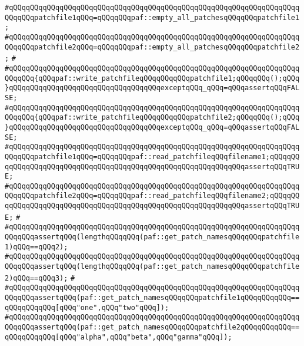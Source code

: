 \newline
\verb|#qQQqqQQqqQQqqQQqqQQqqQQqqQQqqQQqqQQqqQQqqQQqqQQqqQQqqQQqqQQqqQQqqQQqqQQqqQQqpatchfile1qQQq=qQQqqQQqpaf::empty_all_patchesqQQqqQQqpatchfile1;|\newline
\verb|#qQQqqQQqqQQqqQQqqQQqqQQqqQQqqQQqqQQqqQQqqQQqqQQqqQQqqQQqqQQqqQQqqQQqqQQqqQQqpatchfile2qQQq=qQQqqQQqpaf::empty_all_patchesqQQqqQQqpatchfile2;|\newline
\verb|#|\newline
\verb|#qQQqqQQqqQQqqQQqqQQqqQQqqQQqqQQqqQQqqQQqqQQqqQQqqQQqqQQqqQQqqQQqqQQqqQQqqQQq{qQQqpaf::write_patchfileqQQqqQQqqQQqpatchfile1;qQQqqQQq();qQQq}qQQqqQQqqQQqqQQqqQQqqQQqqQQqqQQqqQQqexceptqQQq_qQQq=qQQqassertqQQqFALSE;|\newline
\verb|#qQQqqQQqqQQqqQQqqQQqqQQqqQQqqQQqqQQqqQQqqQQqqQQqqQQqqQQqqQQqqQQqqQQqqQQqqQQq{qQQqpaf::write_patchfileqQQqqQQqqQQqpatchfile2;qQQqqQQq();qQQq}qQQqqQQqqQQqqQQqqQQqqQQqqQQqqQQqqQQqexceptqQQq_qQQq=qQQqassertqQQqFALSE;|\newline
\newline
\newline
\newline
\verb|#qQQqqQQqqQQqqQQqqQQqqQQqqQQqqQQqqQQqqQQqqQQqqQQqqQQqqQQqqQQqqQQqqQQqqQQqqQQqpatchfile1qQQq=qQQqqQQqpaf::read_patchfileqQQqfilename1;qQQqqQQqqQQqqQQqqQQqqQQqqQQqqQQqqQQqqQQqqQQqqQQqqQQqqQQqqQQqqQQqassertqQQqTRUE;|\newline
\verb|#qQQqqQQqqQQqqQQqqQQqqQQqqQQqqQQqqQQqqQQqqQQqqQQqqQQqqQQqqQQqqQQqqQQqqQQqqQQqpatchfile2qQQq=qQQqqQQqpaf::read_patchfileqQQqfilename2;qQQqqQQqqQQqqQQqqQQqqQQqqQQqqQQqqQQqqQQqqQQqqQQqqQQqqQQqqQQqqQQqassertqQQqTRUE;|\newline
\verb|#|\newline
\verb|#qQQqqQQqqQQqqQQqqQQqqQQqqQQqqQQqqQQqqQQqqQQqqQQqqQQqqQQqqQQqqQQqqQQqqQQqqQQqassertqQQq(lengthqQQqqQQq(paf::get_patch_namesqQQqqQQqpatchfile1)qQQq==qQQq2);|\newline
\verb|#qQQqqQQqqQQqqQQqqQQqqQQqqQQqqQQqqQQqqQQqqQQqqQQqqQQqqQQqqQQqqQQqqQQqqQQqqQQqassertqQQq(lengthqQQqqQQq(paf::get_patch_namesqQQqqQQqpatchfile2)qQQq==qQQq3);|\newline
\verb|#|\newline
\verb|#qQQqqQQqqQQqqQQqqQQqqQQqqQQqqQQqqQQqqQQqqQQqqQQqqQQqqQQqqQQqqQQqqQQqqQQqqQQqassertqQQq(paf::get_patch_namesqQQqqQQqpatchfile1qQQqqQQqqQQq==qQQqqQQqqQQq[qQQq"one",qQQq"two"qQQq]);|\newline
\verb|#qQQqqQQqqQQqqQQqqQQqqQQqqQQqqQQqqQQqqQQqqQQqqQQqqQQqqQQqqQQqqQQqqQQqqQQqqQQqassertqQQq(paf::get_patch_namesqQQqqQQqpatchfile2qQQqqQQqqQQq==qQQqqQQqqQQq[qQQq"alpha",qQQq"beta",qQQq"gamma"qQQq]);|\newline
